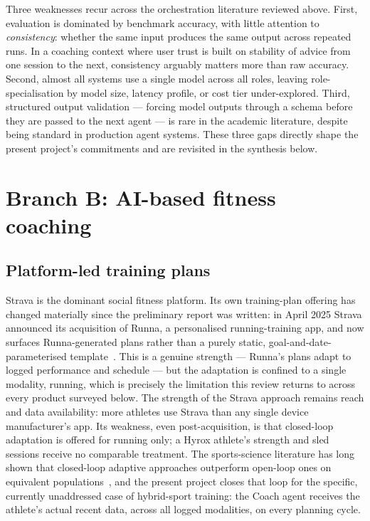 Three weaknesses recur across the orchestration literature reviewed above. First, evaluation is dominated by benchmark accuracy, with little attention to \emph{consistency}: whether the same input produces the same output across repeated runs. In a coaching context where user trust is built on stability of advice from one session to the next, consistency arguably matters more than raw accuracy. Second, almost all systems use a single model across all roles, leaving role-specialisation by model size, latency profile, or cost tier under-explored. Third, structured output validation --- forcing model outputs through a schema before they are passed to the next agent --- is rare in the academic literature, despite being standard in production agent systems. These three gaps directly shape the present project's commitments and are revisited in the synthesis below.

\section{Branch B: AI-based fitness coaching}

\subsection{Platform-led training plans}

Strava is the dominant social fitness platform. Its own training-plan offering has changed materially since the preliminary report was written: in April 2025 Strava announced its acquisition of Runna, a personalised running-training app, and now surfaces Runna-generated plans rather than a purely static, goal-and-date-parameterised template~\cite{strava_runna}. This is a genuine strength --- Runna's plans adapt to logged performance and schedule --- but the adaptation is confined to a single modality, running, which is precisely the limitation this review returns to across every product surveyed below. The strength of the Strava approach remains reach and data availability: more athletes use Strava than any single device manufacturer's app. Its weakness, even post-acquisition, is that closed-loop adaptation is offered for running only; a Hyrox athlete's strength and sled sessions receive no comparable treatment. The sports-science literature has long shown that closed-loop adaptive approaches outperform open-loop ones on equivalent populations~\cite{busso2003}, and the present project closes that loop for the specific, currently unaddressed case of hybrid-sport training: the Coach agent receives the athlete's actual recent data, across all logged modalities, on every planning cycle.

